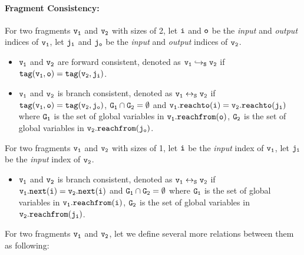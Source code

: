 \paragraph{Fragment Consistency:} For two fragments $\tt v_1$ and $\tt v_2$ with sizes of 2, let $\tt i$ and $\tt o$ be the {\em input} and {\em output} indices of $\tt v_1$, let $\tt j_i$ and $\tt j_o$ be the {\em input} and {\em output} indices of $\tt v_2$.
 \begin{itemize}
 \item   $\tt v_1$ and $\tt v_2$ are forward consistent, denoted as $\tt v_1 \hookrightarrow_S v_2$ if $\tt tag( v_1,\tt o) = tag(v_2,\tt j_i)$.   
 \item $\tt v_1$ and $\tt v_2$ is branch consistent, denoted as $\tt v_1 \leftrightarrow_S v_2$ if $\tt tag( v_1,\tt o) = tag(v_2,\tt j_o)$, $\tt G_1 \cap G_2 = \emptyset$ and $\tt v_1.{\tt reachto}(\tt i) = v_2.{\tt reachto}(\tt j_i)$ where $\tt G_1$ is the set of global variables in $\tt v_1.{\tt reachfrom}(\tt o)$,  $\tt G_2$ is the set of global variables in $\tt v_2.{\tt reachfrom}(\tt j_o)$. 
 
    \end{itemize}
For two fragments $\tt v_1$ and $\tt v_2$ with sizes of 1, let $\tt i$ be the {\em input} index of $\tt v_1$, let $\tt j_i$ be the {\em input} index of $\tt v_2$.
 \begin{itemize}

 \item $\tt v_1$ and $\tt v_2$ is branch consistent, denoted as $\tt v_1 \leftrightarrow_S v_2$ if $\tt v_1.next(i) = v_2.next(i)$ and $\tt G_1 \cap G_2 = \emptyset$ where $\tt G_1$ is the set of global variables in $\tt v_1.{\tt reachfrom}(\tt i)$,  $\tt G_2$ is the set of global variables in $\tt v_2.{\tt reachfrom}(\tt j_i)$.
 \end{itemize}
For two fragments $\tt v_1$ and $\tt v_2$, let we define several more relations between them as following:
